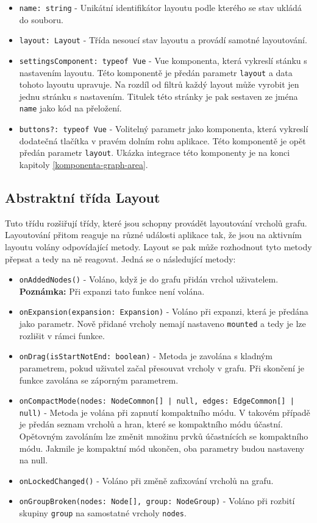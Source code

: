 \begin{itemize}
  \item \texttt{name: string} - Unikátní identifikátor layoutu podle kterého se stav ukládá do souboru.
  \item \texttt{layout: Layout} - Třída nesoucí stav layoutu a provádí samotné layoutování.
  \item \texttt{settingsComponent: typeof Vue} - Vue komponenta, která vykreslí stánku s nastavením layoutu. Této komponentě je předán parametr \texttt{layout} a data tohoto layoutu upravuje. Na rozdíl od filtrů každý layout může vyrobit jen jednu stránku s nastavením. Titulek této stránky je pak sestaven ze jména \texttt{name} jako kód na přeložení.
  \item \texttt{buttons?: typeof Vue} - Volitelný parametr jako komponenta, která vykreslí dodatečná tlačítka v pravém dolním rohu aplikace. Této komponentě je opět předán parametr \texttt{layout}. Ukázka integrace této komponenty je na konci kapitoly \ref{komponenta-graph-area}.
\end{itemize}

\subsection{Abstraktní třída Layout}
Tuto třídu rozšiřují třídy, které jsou schopny provádět layoutování vrcholů grafu. Layoutování přitom reaguje na různé události aplikace tak, že jsou na aktivním layoutu volány odpovídající metody. Layout se pak může rozhodnout tyto metody přepsat a tedy na ně reagovat. Jedná se o následující metody:

\begin{itemize}
  \item \texttt{onAddedNodes()} - Voláno, když je do grafu přidán vrchol uživatelem. \textbf{Poznámka:} Při expanzi tato funkce není volána.
  \item \texttt{onExpansion(expansion: Expansion)} - Voláno při expanzi, která je předána jako parametr. Nově přidané vrcholy nemají nastaveno \texttt{mounted} a tedy je lze rozlišit v rámci funkce.
  \item \texttt{onDrag(isStartNotEnd: boolean)} - Metoda je zavolána s kladným parametrem, pokud uživatel začal přesouvat vrcholy v grafu. Při skončení je funkce zavolána se záporným parametrem.
  \item \texttt{onCompactMode(nodes: NodeCommon[] | null, edges: EdgeCommon[] | null)} - Metoda je volána při zapnutí kompaktního módu. V takovém případě je předán seznam vrcholů a hran, které se kompaktního módu účastní. Opětovným zavoláním lze změnit množinu prvků účastnících se kompaktního módu. Jakmile je kompaktní mód ukončen, oba parametry budou nastaveny na null.
  \item \texttt{onLockedChanged()} - Voláno při změně zafixování vrcholů na grafu.
  \item \texttt{onGroupBroken(nodes: Node[], group: NodeGroup)} - Voláno při rozbití skupiny \texttt{group} na samostatné vrcholy \texttt{nodes}.
\end{itemize}

